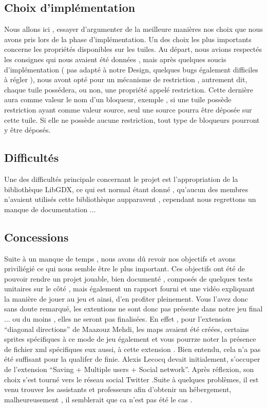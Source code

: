 \documentclass[a4paper,10pt]{article}
\begin{document}
\subsection{Choix d'implémentation}
Nous allons ici , essayer d'argumenter de la meilleure manières nos choix que nous avons pris lors de la phase d'implémentation.
Un des choix les plus importants concerne les propriétés disponibles sur les tuiles. Au départ, nous avions respectés les consignes qui nous
avaient été données , mais après quelques soucis d'implémentation ( pas adapté à notre Design, quelques bugs également difficiles à régler ), nous
avont opté pour un mécanisme de restriction , autrement dit, chaque tuile possédera, ou non, une propriété appelé restriction. Cette dernière aura
comme valeur le nom d'un bloqueur, exemple , si une tuile possède restriction ayant comme valeur source, seul une source pourra être déposée sur cette tuile.
Si elle ne possède aucune restriction, tout type de bloqueurs pourront y être déposés.
\subsection{Difficultés}
Une des difficultés principale concernant le projet est l'appropriation de la bibliothèque LibGDX, ce qui est normal étant donné , qu'aucun des membres
n'avaient utilisés cette bibliothèque aupparavent , cependant nous regrettons un manque de documentation ...
\subsection{Concessions}
Suite à un manque de temps , nous avons dû revoir nos objectifs et avons priviliégié ce qui nous semble être le plus important. 
Ces objectifs ont été de pouvoir rendre un projet jouable, bien documenté , composés de quelques tests unitaires sur le côté , mais 
également un rapport fourni et une vidéo expliquant la manière de jouer au jeu et ainsi, d'en profiter pleinement. 
Vous l'avez donc sans doute remarqué, les extentions ne sont donc pas présente dans notre jeu final ... ou du moins , elles ne seront pas finalisées.
En effet , pour l'extension ``diagonal directions'' de Maazouz Mehdi, les maps avaient été créées, certains sprites spécifiques à ce mode de jeu également
et vous pourrze noter la présence de fichier xml spécifiques eux aussi, à cette extension . Bien entendu, cela n'a pas été suffisant pour la qualifer de finie.
Alexis Lecocq devait initialement, s'occuper de l'extension ``Saving + Multiple users + Social network''. Après réflexion, son choix
s'est tourné vers le réseau social Twitter .Suite à quelques problèmes, il est venu trouver les assistants et professeurs afin d'obtenir un hébergement,
malheureusement , il semblerait que ca n'est pas été le cas .
\end{document}
